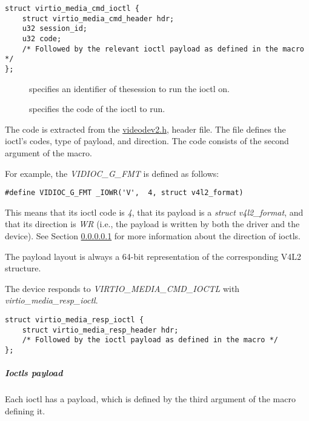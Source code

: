 \begin{lstlisting}
struct virtio_media_cmd_ioctl {
    struct virtio_media_cmd_header hdr;
    u32 session_id;
    u32 code;
    /* Followed by the relevant ioctl payload as defined in the macro */
};
\end{lstlisting}

\begin{description}
\item[] specifies an identifier of thesession to run the ioctl on.
\item[] specifies the code of the  ioctl to run.
\end{description}

The code is extracted from the
\href{https://www.kernel.org/doc/html/latest/userspace-api/media/v4l/videodev.html}{videodev2.h},
header file. The file defines the ioctl's codes, type of payload, and
direction. The code consists of the second argument of the  macro.

For example, the \textit{VIDIOC_G_FMT} is defined as follows:

\begin{lstlisting}
#define VIDIOC_G_FMT _IOWR('V',  4, struct v4l2_format)
\end{lstlisting}

This means that its ioctl code is \textit{4}, that its payload is a
\textit{struct v4l2_format}, and that its direction is \textit{WR} (i.e., the
payload is written by both the driver and the device).
See Section \ref{sec:Device Types / Media Device / V4L2 ioctls / Ioctls payload}
for more information about the direction of ioctls.

The payload layout is always a 64-bit representation of the corresponding
V4L2 structure.

The device responds to \textit{VIRTIO_MEDIA_CMD_IOCTL} with \textit{virtio_media_resp_ioctl}.

\begin{lstlisting}
struct virtio_media_resp_ioctl {
    struct virtio_media_resp_header hdr;
    /* Followed by the ioctl payload as defined in the macro */
};
\end{lstlisting}

\subparagraph{Ioctls payload}\label{sec:Device Types / Media Device / V4L2 ioctls / Ioctls payload}

Each ioctl has a payload, which is defined by the third argument of the
 macro defining it. 

